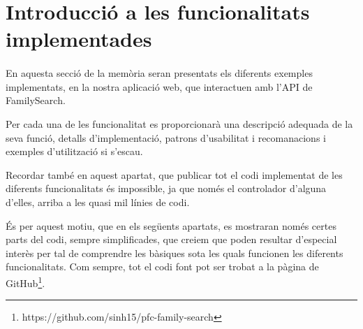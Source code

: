 \section{Introducció a les funcionalitats implementades}

    \paragraph{}
    En aquesta secció de la memòria seran presentats els diferents exemples implementats, en la nostra aplicació web, que interactuen amb l'API de FamilySearch.

    Per cada una de les funcionalitat es proporcionarà una descripció adequada de la seva funció, detalls d'implementació, patrons d'usabilitat i recomanacions i exemples d'utilització si s'escau.

    Recordar també en aquest apartat, que publicar tot el codi implementat de les diferents funcionalitats és impossible, ja que només el controlador d'alguna d'elles, arriba a les quasi mil línies de codi.

    És per aquest motiu, que en els següents apartats, es mostraran només certes parts del codi, sempre simplificades, que creiem que poden resultar d'especial interès per tal de comprendre les bàsiques sota les quals funcionen les diferents funcionalitats. Com sempre, tot el codi font pot ser trobat a la pàgina de GitHub\footnote{https://github.com/sinh15/pfc-family-search}.
